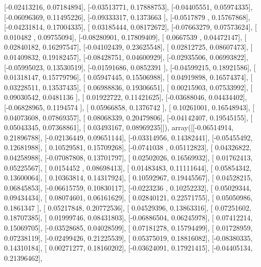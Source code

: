 \documentclass{article}
\begin{document}
       [-0.02413216,  0.07184894],
       [-0.03513771,  0.17888753],
       [-0.04405551,  0.05974335],
       [-0.06096369,  0.11495226],
       [-0.09333317,  0.1373663 ],
       [-0.0517879 ,  0.15767868],
       [-0.04231814,  0.17004335],
       [ 0.03185444,  0.08172672],
       [-0.07663279,  0.07573624],
       [ 0.010482  ,  0.09755094],
       [-0.08280901,  0.17809409],
       [ 0.0667539 ,  0.04472147],
       [ 0.02840182,  0.16297547],
       [-0.04102439,  0.23625548],
       [ 0.02812725,  0.08607473],
       [ 0.01409832,  0.19182457],
       [-0.08428751,  0.04600929],
       [-0.02935506,  0.06993822],
       [-0.05995023,  0.13530519],
       [-0.01591686,  0.0852391 ],
       [-0.04599215,  0.18921586],
       [ 0.01318147,  0.15779796],
       [ 0.05947445,  0.15506988],
       [ 0.04919898,  0.16574374],
       [ 0.03228511,  0.13537435],
       [ 0.06988836,  0.19306651],
       [ 0.00215903,  0.07533992],
       [ 0.09030542,  0.0481136 ],
       [ 0.01922722,  0.11421625],
       [-0.03688046,  0.04434402],
       [-0.06828965,  0.1194574 ],
       [ 0.05966858,  0.1376742 ],
       [ 0.10261001,  0.16548943],
       [ 0.04073608,  0.07869357],
       [ 0.08068339,  0.20479806],
       [-0.04142407,  0.19545155],
       [ 0.05043345,  0.07368861],
       [ 0.03493167,  0.08969235]]), array([[-0.06514914,  0.21896788],
       [-0.02136449,  0.09651144],
       [-0.03314956,  0.14382441],
       [-0.05455492,  0.12681988],
       [ 0.10529581,  0.15709268],
       [-0.0741038 ,  0.05112823],
       [ 0.04326822,  0.04258988],
       [-0.07087808,  0.13701797],
       [ 0.02502026,  0.16569932],
       [ 0.01762413,  0.05225567],
       [ 0.0154452 ,  0.08698413],
       [ 0.01483483,  0.11111644],
       [ 0.05854342,  0.13600064],
       [ 0.10363814,  0.14317924],
       [ 0.10592967,  0.19445567],
       [ 0.04528215,  0.06845853],
       [-0.06615759,  0.10830117],
       [-0.0223236 ,  0.10252232],
       [ 0.05029344,  0.09434434],
       [ 0.08074601,  0.06161629],
       [ 0.02840121,  0.22571755],
       [ 0.05050986,  0.1861347 ],
       [ 0.05217848,  0.20772536],
       [ 0.04529396,  0.13863316],
       [ 0.07251602,  0.18707385],
       [ 0.01999746,  0.08431803],
       [-0.06886504,  0.06245978],
       [ 0.07412214,  0.15069705],
       [-0.03528685,  0.04028599],
       [ 0.07181278,  0.15794499],
       [ 0.01728959,  0.07238119],
       [-0.02499426,  0.21225539],
       [ 0.05375019,  0.18816082],
       [-0.08380335,  0.14310184],
       [ 0.00271277,  0.18160202],
       [-0.03624091,  0.17921415],
       [-0.04405134,  0.21396462],
\end{document}
